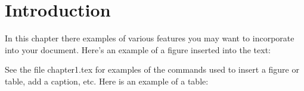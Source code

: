 
\cleardoublepage


\chapter{Introduction}
\label{makereference1}

In this chapter there examples of various features you may want to
incorporate into your document. Here's an example of a figure
inserted into the text:


See the file chapter1.tex for examples of the commands used to
insert a figure or table, add a caption, etc.  Here is an example of
a table:

